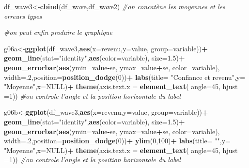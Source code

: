 \documentclass[
]{book}
\newenvironment{Shaded}{\begin{snugshade}}{\end{snugshade}}
\newcommand{\CommentTok}[1]{\textcolor[rgb]{0.56,0.35,0.01}{\textit{#1}}}
\newcommand{\DataTypeTok}[1]{\textcolor[rgb]{0.13,0.29,0.53}{#1}}
\newcommand{\DecValTok}[1]{\textcolor[rgb]{0.00,0.00,0.81}{#1}}
\newcommand{\FloatTok}[1]{\textcolor[rgb]{0.00,0.00,0.81}{#1}}
\newcommand{\KeywordTok}[1]{\textcolor[rgb]{0.13,0.29,0.53}{\textbf{#1}}}
\newcommand{\NormalTok}[1]{#1}
\newcommand{\OperatorTok}[1]{\textcolor[rgb]{0.81,0.36,0.00}{\textbf{#1}}}
\newcommand{\OtherTok}[1]{\textcolor[rgb]{0.56,0.35,0.01}{#1}}
\newcommand{\StringTok}[1]{\textcolor[rgb]{0.31,0.60,0.02}{#1}}
\begin{document}
\begin{Shaded}
\begin{Highlighting}[]
{{{{{{{{\NormalTok{df_wave3<-}\KeywordTok{cbind}\NormalTok{(df_wave,df_wave2) }\CommentTok{#on concatène les moyennes et les erreurs types}

\CommentTok{#on peut enfin produire le graphique}

\NormalTok{g06a<-}\KeywordTok{ggplot}\NormalTok{(df_wave3,}\KeywordTok{aes}\NormalTok{(}\DataTypeTok{x=}\NormalTok{revenu,}\DataTypeTok{y=}\NormalTok{value, }\DataTypeTok{group=}\NormalTok{variable))}\OperatorTok{+}
\StringTok{  }\KeywordTok{geom_line}\NormalTok{(}\DataTypeTok{stat=}\StringTok{"identity"}\NormalTok{,}\KeywordTok{aes}\NormalTok{(}\DataTypeTok{color=}\NormalTok{variable), }\DataTypeTok{size=}\FloatTok{1.5}\NormalTok{)}\OperatorTok{+}\StringTok{ }
\StringTok{  }\KeywordTok{geom_errorbar}\NormalTok{(}\KeywordTok{aes}\NormalTok{(}\DataTypeTok{ymin=}\NormalTok{value}\OperatorTok{-}\NormalTok{se, }\DataTypeTok{ymax=}\NormalTok{value}\OperatorTok{+}\NormalTok{se, }\DataTypeTok{color=}\NormalTok{variable), }\DataTypeTok{width=}\NormalTok{.}\DecValTok{2}\NormalTok{,}\DataTypeTok{position=}\KeywordTok{position_dodge}\NormalTok{(}\DecValTok{0}\NormalTok{))}\OperatorTok{+}
\StringTok{  }\KeywordTok{labs}\NormalTok{(}\DataTypeTok{title=} \StringTok{"Confiance et revenu"}\NormalTok{,}\DataTypeTok{y=} \StringTok{"Moyenne"}\NormalTok{,}\DataTypeTok{x=}\OtherTok{NULL}\NormalTok{)}\OperatorTok{+}
\StringTok{  }\KeywordTok{theme}\NormalTok{(}\DataTypeTok{axis.text.x =} \KeywordTok{element_text}\NormalTok{( }\DataTypeTok{angle=}\DecValTok{45}\NormalTok{, }\DataTypeTok{hjust =}\DecValTok{1}\NormalTok{)) }\CommentTok{#on controle l'angle et la position horizontale du label}

  
\NormalTok{g06b<-}\KeywordTok{ggplot}\NormalTok{(df_wave3,}\KeywordTok{aes}\NormalTok{(}\DataTypeTok{x=}\NormalTok{revenu,}\DataTypeTok{y=}\NormalTok{value, }\DataTypeTok{group=}\NormalTok{variable))}\OperatorTok{+}
\StringTok{  }\KeywordTok{geom_line}\NormalTok{(}\DataTypeTok{stat=}\StringTok{"identity"}\NormalTok{,}\KeywordTok{aes}\NormalTok{(}\DataTypeTok{color=}\NormalTok{variable), }\DataTypeTok{size=}\FloatTok{1.5}\NormalTok{)}\OperatorTok{+}\StringTok{ }
\StringTok{  }\KeywordTok{geom_errorbar}\NormalTok{(}\KeywordTok{aes}\NormalTok{(}\DataTypeTok{ymin=}\NormalTok{value}\OperatorTok{-}\NormalTok{se, }\DataTypeTok{ymax=}\NormalTok{value}\OperatorTok{+}\NormalTok{se, }\DataTypeTok{color=}\NormalTok{variable), }\DataTypeTok{width=}\NormalTok{.}\DecValTok{2}\NormalTok{,}\DataTypeTok{position=}\KeywordTok{position_dodge}\NormalTok{(}\DecValTok{0}\NormalTok{))}\OperatorTok{+}
\StringTok{  }\KeywordTok{ylim}\NormalTok{(}\DecValTok{0}\NormalTok{,}\DecValTok{100}\NormalTok{)}\OperatorTok{+}
\StringTok{  }\KeywordTok{labs}\NormalTok{(}\DataTypeTok{title=} \StringTok{""}\NormalTok{,}\DataTypeTok{y=} \StringTok{"Moyenne"}\NormalTok{,}\DataTypeTok{x=}\OtherTok{NULL}\NormalTok{)}\OperatorTok{+}
\StringTok{  }\KeywordTok{theme}\NormalTok{(}\DataTypeTok{axis.text.x =} \KeywordTok{element_text}\NormalTok{( }\DataTypeTok{angle=}\DecValTok{45}\NormalTok{, }\DataTypeTok{hjust =}\DecValTok{1}\NormalTok{)) }\CommentTok{#on controle l'angle et la position horizontale du label}

}}}}}}}}
\end{Highlighting}
\end{Shaded}
\end{document}
